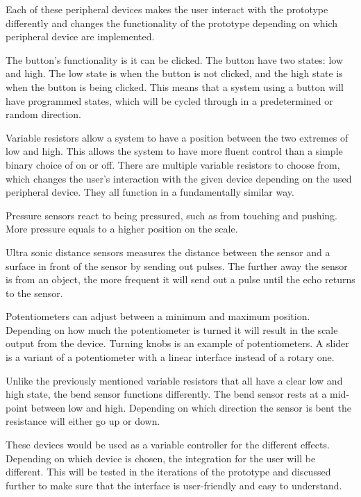 Each of these peripheral devices makes the user interact with the prototype differently and changes the functionality of the prototype depending on which peripheral device are implemented.
 
The button's functionality is it can be clicked. The button have two states: low and high. The low state is when the button is not clicked, and the high state is when the button is being clicked. This means that a system using a button will have programmed states, which will be cycled through in a predetermined or random direction.

Variable resistors allow a system to have a position between the two extremes of low and high. This allows the system to have more fluent control than a simple binary choice of on or off. There are multiple variable resistors to choose from, which changes the user's interaction with the given device depending on the used peripheral device.  They all function in a fundamentally similar way. 

Pressure sensors react to being pressured, such as from touching and pushing. More pressure equals to a higher position on the scale.

Ultra sonic distance sensors measures the distance between the sensor and a surface in front of the sensor by sending out pulses. The further away the sensor is from an object, the more frequent it will send out a pulse until the echo returns to the sensor. 

Potentiometers can adjust between a minimum and maximum position. Depending on how much the potentiometer is turned it will result in the scale output from the device. Turning knobs is an example of potentiometers. A slider is a variant of a potentiometer with a linear interface instead of a rotary one.

Unlike the previously mentioned variable resistors that all have a clear low and high state, the bend sensor functions differently. The bend sensor rests at a mid-point between low and high. Depending on which direction the sensor is bent the resistance will either go up or down.

These devices would be used as a variable controller for the different effects. Depending on which device is chosen, the integration for the user will be different. This will be tested in the iterations of the prototype and discussed further to make sure that the interface is user-friendly and easy to understand. 


